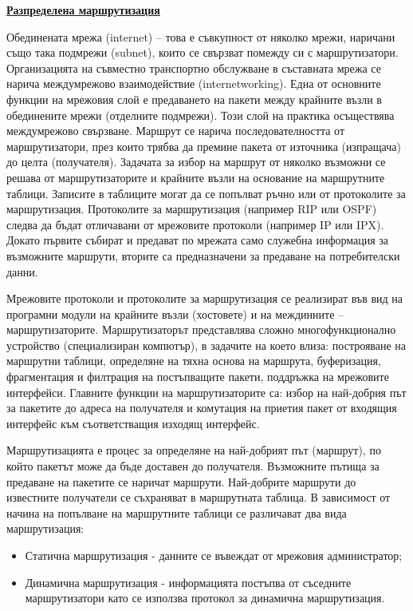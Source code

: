 \documentclass{article}
\begin{document}
\textbf{\underline{Разпределена маршрутизация}}

Обединената мрежа (internet) – това е съвкупност от няколко мрежи, наричани също така подмрежи (subnet), които се свързват
помежду си с маршрутизатори. Организацията на съвместно транспортно обслужване в съставната мрежа се нарича междумрежово
взаимодействие (internetworking). Една от основните функции на мрежовия слой е предаването на пакети между крайните възли в
обединените мрежи (отделните подмрежи). Този слой на практика осъществява междумрежово свързване. Маршрут се нарича
последователността от маршрутизатори, през които трябва да премине пакета от източника (изпращача) до целта (получателя).
Задачата за избор на маршрут от няколко възможни се решава от маршрутизаторите и крайните възли на основание на маршрутните таблици.
Записите в таблиците могат да се попълват ръчно или от протоколите за маршрутизация. Протоколите за маршрутизация (например RIP
или OSPF) следва да бъдат отличавани от мрежовите протоколи (например IP или IPX). Докато първите събират и предават по мрежата
само служебна информация за възможните маршрути, вторите са предназначени за предаване на потребителски данни.

Мрежовите протоколи и протоколите за маршрутизация се реализират във вид на програмни модули на крайните възли (хостовете) и на междинните – маршрутизаторите.
Маршрутизаторът представлява сложно многофункционално устройство (специализиран компютър), в задачите на което влиза: построяване
на маршрутни таблици, определяне на тяхна основа на маршрута, буферизация, фрагментация и филтрация на постъпващите пакети,
поддръжка на мрежовите интерфейси. Главните функции на маршрутизаторите са: избор на най-добрия път за пакетите до адреса на
получателя и комутация на приетия пакет от входящия интерфейс към съответстващия изходящ интерфейс.

Маршрутизацията е процес за определяне на най-добрият път (маршрут), по който пакетът може да бъде доставен до получателя.
Възможните пътища за предаване на пакетите се наричат маршрути. Най-добрите маршрути до известните получатели се съхраняват в
маршрутната таблица. В зависимост от начина на попълване на маршрутните таблици се различават два вида маршрутизация:
\begin{itemize}
    \item Статична маршрутизация - данните се въвеждат от мрежовия администратор;
    \item Динамична маршрутизация - информацията постъпва от съседните маршрутизатори като се използва протокол за динамична маршрутизация.
\end{itemize}
\end{document}
